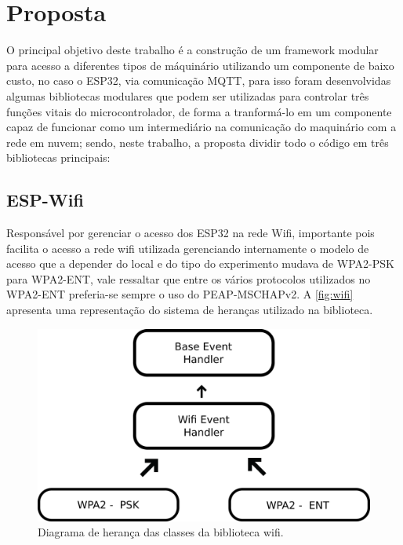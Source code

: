 \chapter[Proposta]{Proposta}

O principal objetivo deste trabalho é a construção de um framework modular para acesso a diferentes tipos de máquinário
utilizando um componente de baixo custo, no caso o ESP32, via comunicação \ac{MQTT}, para isso foram desenvolvidas algumas 
bibliotecas modulares que podem ser utilizadas para controlar três funções vitais do microcontrolador, de forma a 
tranformá-lo em um componente capaz de funcionar como um intermediário na comunicação do maquinário com a rede em nuvem; 
sendo, neste trabalho, a proposta dividir todo o código em três bibliotecas principais:

\section{ESP-Wifi}

Responsável por gerenciar o acesso dos ESP32 na rede Wifi, importante pois facilita o acesso a rede wifi utilizada 
gerenciando internamente o modelo de acesso que a depender do local e do tipo do experimento mudava de \ac{WPA2-PSK}
para \ac{WPA2-ENT}, vale ressaltar que entre os vários protocolos utilizados no \ac{WPA2-ENT} preferia-se sempre o uso do 
\ac{PEAP-MSCHAPv2}. A \autoref{fig:wifi} apresenta uma representação do sistema de heranças utilizado na biblioteca.

\begin{figure}[htb]
    \begin{center}
	    \includegraphics[scale=0.5]{figs/wifi-dia.png}
	\end{center}
	\caption{\label{fig:wifi} Diagrama de herança das classes da biblioteca wifi.} 
\end{figure}


